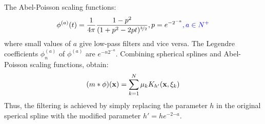 The Abel-Poisson scaling functions:
\[ \phi^{(a)}(t)=\frac{1}{4\pi}\frac{1-p^2}{(1+p^2-2pt)^{\nicefrac{3}{2}}},p=e^{-2^{-a}}{\color{blue},a\in N^+} \]
where small values of $a$ give low-pass filters and vice versa.
The Legendre coefficients $\phi_n^{(a)}$ of $\phi^{(a)}$ are $e^{-n2^{-a}}$.
Combining spherical splines and Abel-Poisson scaling functions, obtain:
\[ (m*\phi)(\mathbf{x})=\sum_{k=1}^N\mu_kK_{h'}(\mathbf{x},\mathbf{\xi}_k)\]
Thus, the filtering is achieved by simply replacing the parameter $h$
in the original sperical spline with the modified parameter $h'=he^{-2{-a}}$.

